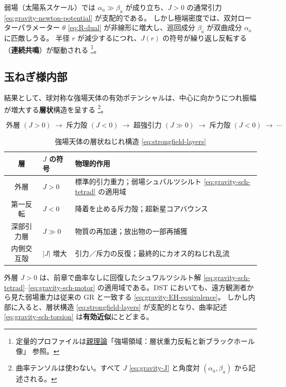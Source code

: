\documentclass[dvipdfmx,a4paper,oneside]{jsbook}
\numberwithin{equation}{chapter}
\begin{document}
弱場（太陽系スケール）では \(\alpha_a \gg \beta_a\) が成り立ち、\(J > 0\) の通常引力 \eqref{eq:gravity-newton-potential} が支配的である。
しかし極端密度では、双対ローターパラメーター \(\theta\) \eqref{eq:R-dual} が非線形に増大し、巡回成分 \(\beta_a\) が双曲成分 \(\alpha_a\) に匹敵しうる。
半径 \(r\) が減少するにつれ、\(J(r)\) の符号が繰り返し反転する（\textbf{連続共鳴}）が駆動される \footnote{定量的プロファイルは\hyperref[sec:sister-manuscripts]{親理論}「強場領域：層状重力反転と新ブラックホール像」 参照。}。

\subsection{玉ねぎ様内部}

結果として、球対称な強場天体の有効ポテンシャルは、中心に向かうにつれ振幅が増大する\textbf{層状}構造を呈する \footnote{曲率テンソルは使わない。すべて \(J\) \eqref{eq:gravity-J} と角度対 \((\alpha_a, \beta_a)\) から記述される。}。

\begin{equation}
  \boxed{\;
  \text{外層 } (J > 0)
  \;\to\;
  \text{斥力殻 } (J < 0)
  \;\to\;
  \text{超強引力 } (J \gg 0)
  \;\to\;
  \text{斥力殻 } (J < 0)
  \;\to\; \cdots
  \;}
  \label{eq:strongfield-layers}
\end{equation}

\begin{table}[htbp]
  \centering
  \caption{強場天体の層状ねじれ構造 \eqref{eq:strongfield-layers}}
  \label{tab:strongfield-layers}
  \begin{tabular}{@{}cll@{}}
    \toprule
    層 & \(J\) の符号 & 物理的作用 \\
    \midrule
    外層 & \(J > 0\) & 標準的引力重力；弱場シュバルツシルト \eqref{eq:gravity-sch-tetrad} の適用域 \\
    第一反転 & \(J < 0\) & 降着を止める斥力殻；超新星コアバウンス \\
    深部引力層 & \(J \gg 0\) & 物質の再加速；放出物の一部再捕獲 \\
    内側交互殻 & \(|J|\) 増大 & 引力／斥力の反復；最終的にカオス的ねじれ乱流 \\
    \bottomrule
  \end{tabular}
\end{table}

外層 \(J > 0\) は、前章で曲率なしに回復したシュワルツシルト解 \eqref{eq:gravity-sch-tetrad}–\eqref{eq:gravity-sch-motor} の適用域である。DST においても、遠方観測者から見た弱場重力は従来の GR と一致する \eqref{eq:gravity-EH-equivalence}。
しかし内部に入ると、層状構造 \eqref{eq:strongfield-layers} が支配的となり、曲率記述 \eqref{eq:gravity-sch-torsion} は\textbf{有効近似}にとどまる。
\end{document}
